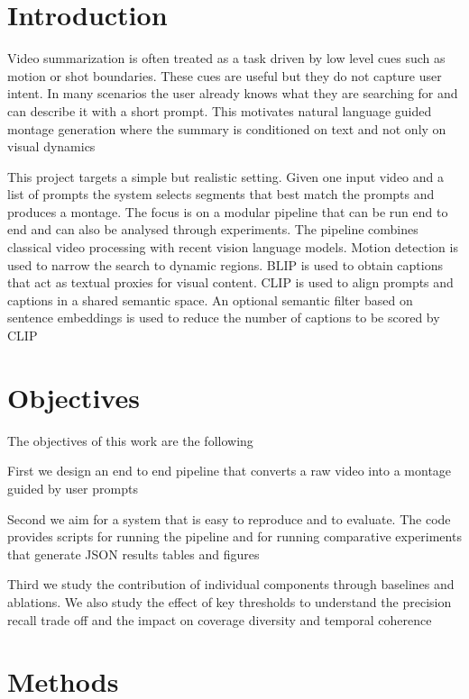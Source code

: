 \documentclass[conference,compsoc]{IEEEtran}
\begin{document}
\IEEEpeerreviewmaketitle

\section{Introduction}
Video summarization is often treated as a task driven by low level cues such as motion or shot boundaries. These cues are useful but they do not capture user intent. In many scenarios the user already knows what they are searching for and can describe it with a short prompt. This motivates natural language guided montage generation where the summary is conditioned on text and not only on visual dynamics

This project targets a simple but realistic setting. Given one input video and a list of prompts the system selects segments that best match the prompts and produces a montage. The focus is on a modular pipeline that can be run end to end and can also be analysed through experiments. The pipeline combines classical video processing with recent vision language models. Motion detection is used to narrow the search to dynamic regions. BLIP is used to obtain captions that act as textual proxies for visual content. CLIP is used to align prompts and captions in a shared semantic space. An optional semantic filter based on sentence embeddings is used to reduce the number of captions to be scored by CLIP

\section{Objectives}
The objectives of this work are the following

First we design an end to end pipeline that converts a raw video into a montage guided by user prompts

Second we aim for a system that is easy to reproduce and to evaluate. The code provides scripts for running the pipeline and for running comparative experiments that generate JSON results tables and figures

Third we study the contribution of individual components through baselines and ablations. We also study the effect of key thresholds to understand the precision recall trade off and the impact on coverage diversity and temporal coherence

\section{Methods}
\end{document}
